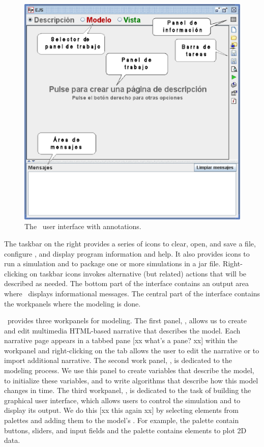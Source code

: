 \begin{figure}[htb]
  \centering
  \includegraphics[scale=\scale]{02EjsIntro/images/EjsInterface.eps}
  \caption{The \Ejs\ user interface with annotations.}
  \label{fig:02EjsIntro/EjsInterface}
\end{figure}

The taskbar on the right provides a series of icons to
clear, open, and save a file, configure \ejs, and display program information and help. It also provides icons to run a
simulation and to package one or more simulations in a jar file. Right-clicking on taskbar icons invokes alternative (but related) actions that will be described as needed. The bottom part of the interface contains an output area where \ejs\ displays informational messages. The central part of the interface contains the workpanels where the modeling is done.

\Ejs\ provides three workpanels for modeling. The first panel, , allows us to create and edit multimedia HTML-based narrative that describes the model. Each narrative page appears in a tabbed pane [xx what's a pane? xx] within the
workpanel and right-clicking on the tab allows the user to edit the narrative or to import additional narrative. The second work panel, , is dedicated to the modeling process. We use this panel to create variables that describe the model, to initialize these variables, and to write algorithms that describe how this model changes in time. The third workpanel, , is dedicated to the task of building the graphical user interface, which allows users to control the simulation and to display its output. We do this [xx this again xx] by selecting elements from palettes and adding them to the model's . For example, the  palette contain buttons, sliders, and input fields and the  palette contains elements to plot 2D data.

